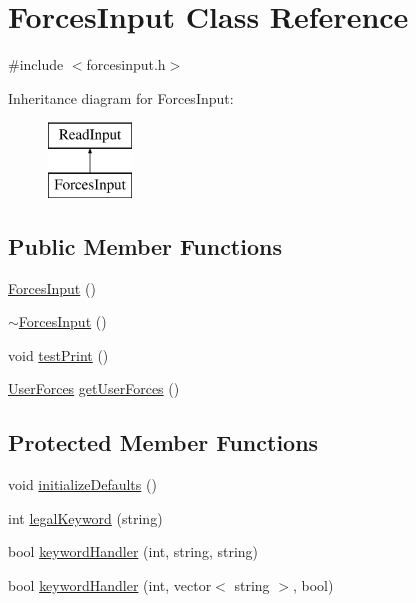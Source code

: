 \hypertarget{class_forces_input}{\section{Forces\-Input Class Reference}
\label{class_forces_input}
}


{\ttfamily \#include $<$forcesinput.\-h$>$}

Inheritance diagram for Forces\-Input\-:\begin{figure}[H]
\begin{center}
\leavevmode
\includegraphics[height=2.000000cm]{class_forces_input}
\end{center}
\end{figure}
\subsection*{Public Member Functions}
\begin{DoxyCompactItemize}
\item 
\hyperlink{class_forces_input_ad3da9dd7decddd74ba054f3e58a848fe}{Forces\-Input} ()
\item 
\hyperlink{class_forces_input_a5891d1dd81b2e4202fe023985aa0ff1b}{$\sim$\-Forces\-Input} ()
\item 
void \hyperlink{class_forces_input_af9ca173b1f53914ba8f118ae2cc211a3}{test\-Print} ()
\item 
\hyperlink{class_user_forces}{User\-Forces} \hyperlink{class_forces_input_ab5262ae1b53c658dbaab66d338e465e2}{get\-User\-Forces} ()
\end{DoxyCompactItemize}
\subsection*{Protected Member Functions}
\begin{DoxyCompactItemize}
\item 
void \hyperlink{class_forces_input_a8bcfe50a80d1c2fe11a742081a5e7343}{initialize\-Defaults} ()
\item 
int \hyperlink{class_forces_input_a5f4086acc636b54b64bcd611bdff1aa4}{legal\-Keyword} (string)
\item 
bool \hyperlink{class_forces_input_a3e82ee7aa3c5bd35a6bb1b06fcafafa9}{keyword\-Handler} (int, string, string)
\item 
bool \hyperlink{class_forces_input_a52965f2bfde734252e7f4f65bf0fde25}{keyword\-Handler} (int, vector$<$ string $>$, bool)
\end{DoxyCompactItemize}


